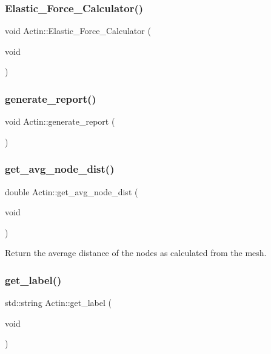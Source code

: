 \subsubsection{\texorpdfstring{Elastic\_Force\_Calculator()}{Elastic\_Force\_Calculator()}}
{\footnotesize\ttfamily void Actin\+::\+Elastic\+\_\+\+Force\+\_\+\+Calculator (\begin{DoxyParamCaption}\item[{void}]{ }\end{DoxyParamCaption})}

\mbox{\label{classActin_a89a64e474276cba5062fb45013deda78}} 
\subsubsection{\texorpdfstring{generate\_report()}{generate\_report()}}
{\footnotesize\ttfamily void Actin\+::generate\+\_\+report (\begin{DoxyParamCaption}{ }\end{DoxyParamCaption})}

\mbox{\label{classActin_ac003b972790cb2209bacabe7106ecdcb}} 
\subsubsection{\texorpdfstring{get\_avg\_node\_dist()}{get\_avg\_node\_dist()}}
{\footnotesize\ttfamily double Actin\+::get\+\_\+avg\+\_\+node\+\_\+dist (\begin{DoxyParamCaption}\item[{void}]{ }\end{DoxyParamCaption})\hspace{0.3cm}{\ttfamily [inline]}}

Return the average distance of the nodes as calculated from the mesh. \mbox{\label{classActin_aebeb549997f6d414aee3d1661363877e}} 
\subsubsection{\texorpdfstring{get\_label()}{get\_label()}}
{\footnotesize\ttfamily std\+::string Actin\+::get\+\_\+label (\begin{DoxyParamCaption}\item[{void}]{ }\end{DoxyParamCaption})\hspace{0.3cm}{\ttfamily [inline]}}

